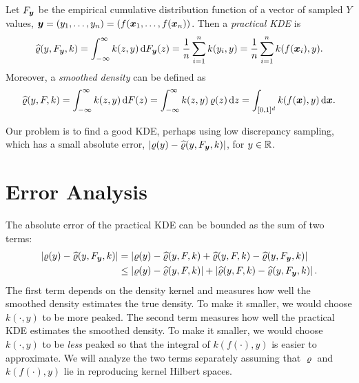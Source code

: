 \documentclass[letterpaper]{amsart}
\newcommand{\hvarrho}{\widehat{\varrho}}
\begin{document}
Let $F_{\boldsymbol{y}}$ be the empirical cumulative distribution function of a vector of sampled $Y$ values, $\boldsymbol{y} = (y_1, \ldots, y_n) = (f(\boldsymbol{x}_1, \ldots, f(\boldsymbol{x}_n))$.  Then a \emph{practical KDE} is
\begin{equation*}
\hvarrho(y,F_{\vy},k) = \int_{-\infty}^{\infty} k(z,y) \, \dif F_{\vy}(z)  = \frac 1n \sum_{i=1}^n k(y_i,y) \\
 = \frac 1n \sum_{i=1}^n k(f(\vx_i),y) .
\end{equation*}
Moreover, a \emph{smoothed density} can be defined as
\[
\hvarrho(y,F,k) = \int_{-\infty}^{\infty} k(z,y) \, \dif F(z) = \int_{-\infty}^{\infty} k(z,y) \, \varrho(z) \, \dif z = \int_{[0,1]^d} k(f(\vx),y) \,  \dif \vx.
\]

Our problem is to find a good KDE, perhaps using low discrepancy sampling, which has a small absolute error, $\abs{\varrho(y) - \hvarrho(y,F_{\vy},k)}$, for $y \in \mathbb{R}$.

\section{Error Analysis}\label{sec:error_analysis}
The absolute error of the practical KDE  can be bounded as the sum of two terms:
\begin{align*}
    \abs{\varrho(y) - \hvarrho(y,F_{\vy},k)} & =
     \abs{\varrho(y) - \hvarrho(y,F,k) + \hvarrho(y,F,k) - \hvarrho(y,F_{\vy},k)} \\
     & \le  \abs{\varrho(y) - \hvarrho(y,F,k)} + \abs{\hvarrho(y,F,k) - \hvarrho(y,F_{\vy},k)}.
\end{align*}
The first term depends on the density kernel and measures how well the smoothed density estimates the true density.  To make it smaller, we would choose $k(\cdot,y)$ to be more peaked.  The second term measures how well the practical KDE estimates the smoothed density.  To make it smaller, we would choose $k(\cdot,y)$ to be \emph{less} peaked so that the integral of $k(f(\cdot),y)$ is easier to approximate.
We will analyze the two terms separately assuming that $\varrho$ and $k(f(\cdot),y)$ lie in reproducing kernel Hilbert spaces.
\end{document}
